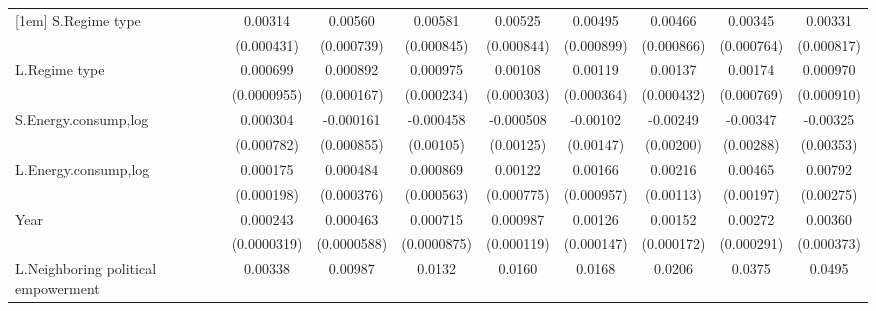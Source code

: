 \begin{table}[htbp]
\begin{tabular}{l*{8}{c}}
[1em]
S.Regime type       &     0.00314\sym{***}&     0.00560\sym{***}&     0.00581\sym{***}&     0.00525\sym{***}&     0.00495\sym{***}&     0.00466\sym{***}&     0.00345\sym{***}&     0.00331\sym{***}\\
                    &  (0.000431)         &  (0.000739)         &  (0.000845)         &  (0.000844)         &  (0.000899)         &  (0.000866)         &  (0.000764)         &  (0.000817)         \\
[1em]
L.Regime type       &    0.000699\sym{***}&    0.000892\sym{***}&    0.000975\sym{***}&     0.00108\sym{***}&     0.00119\sym{***}&     0.00137\sym{***}&     0.00174\sym{**} &    0.000970         \\
                    & (0.0000955)         &  (0.000167)         &  (0.000234)         &  (0.000303)         &  (0.000364)         &  (0.000432)         &  (0.000769)         &  (0.000910)         \\
[1em]
S.Energy.consump,log&    0.000304         &   -0.000161         &   -0.000458         &   -0.000508         &    -0.00102         &    -0.00249         &    -0.00347         &    -0.00325         \\
                    &  (0.000782)         &  (0.000855)         &   (0.00105)         &   (0.00125)         &   (0.00147)         &   (0.00200)         &   (0.00288)         &   (0.00353)         \\
[1em]
L.Energy.consump,log&    0.000175         &    0.000484         &    0.000869         &     0.00122         &     0.00166\sym{*}  &     0.00216\sym{*}  &     0.00465\sym{**} &     0.00792\sym{***}\\
                    &  (0.000198)         &  (0.000376)         &  (0.000563)         &  (0.000775)         &  (0.000957)         &   (0.00113)         &   (0.00197)         &   (0.00275)         \\
[1em]
Year                &    0.000243\sym{***}&    0.000463\sym{***}&    0.000715\sym{***}&    0.000987\sym{***}&     0.00126\sym{***}&     0.00152\sym{***}&     0.00272\sym{***}&     0.00360\sym{***}\\
                    & (0.0000319)         & (0.0000588)         & (0.0000875)         &  (0.000119)         &  (0.000147)         &  (0.000172)         &  (0.000291)         &  (0.000373)         \\
[1em]
L.Neighboring political empowerment&     0.00338         &     0.00987\sym{*}  &      0.0132         &      0.0160         &      0.0168         &      0.0206         &      0.0375         &      0.0495         \\

\end{tabular}
\end{table}
